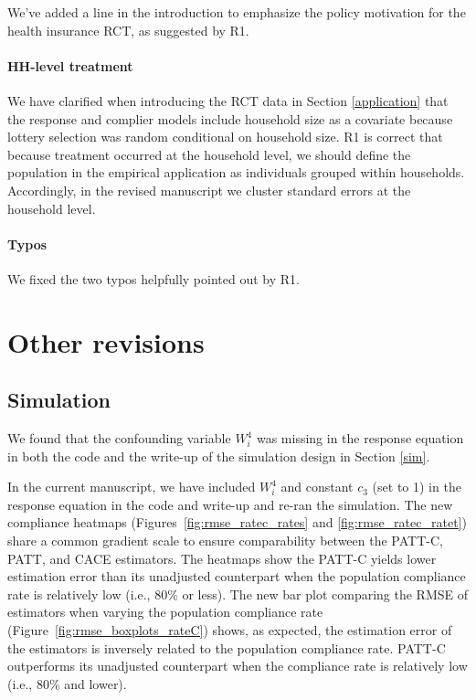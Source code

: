 \documentclass[hidelinks,12pt,letterpaper]{article}
\begin{document}
We've added a line  in the introduction to emphasize the policy motivation for the health insurance RCT, as suggested by R1. 

\paragraph*{HH-level treatment}

We have clarified when introducing the RCT data in Section \ref{application} that the response and complier models include household size as a covariate because lottery selection was random conditional on household size. R1 is correct that because treatment occurred at the household level, we should define the population in the empirical application as individuals grouped within households. Accordingly, in the revised manuscript we cluster standard errors at the household level. 

\paragraph*{Typos}
We fixed the two typos helpfully pointed out by R1. 

\section{Other revisions}

\subsection{Simulation}
We found that the confounding variable $W^{4}_i$ was missing in the response equation in both the code and the write-up of the simulation design in Section \ref{sim}. 

In the current manuscript, we have included $W^{4}_i$ and constant $c_3$ (set to 1) in the response equation in the code and write-up and re-ran the simulation. The new compliance heatmaps (Figures~\ref{fig:rmse_ratec_rates} and \ref{fig:rmse_ratec_ratet}) share a common gradient scale to ensure comparability between the PATT-C, PATT, and CACE estimators. The heatmaps show the PATT-C yields lower estimation error than its unadjusted counterpart when the population compliance rate is relatively low (i.e., 80\% or less). The new bar plot comparing the RMSE of estimators when varying the population compliance rate (Figure~\ref{fig:rmse_boxplots_rateC}) shows, as expected, the estimation error of the estimators is inversely related to the population compliance rate. PATT-C outperforms its unadjusted counterpart when the compliance rate is relatively low (i.e., 80\% and lower). 
\end{document}
